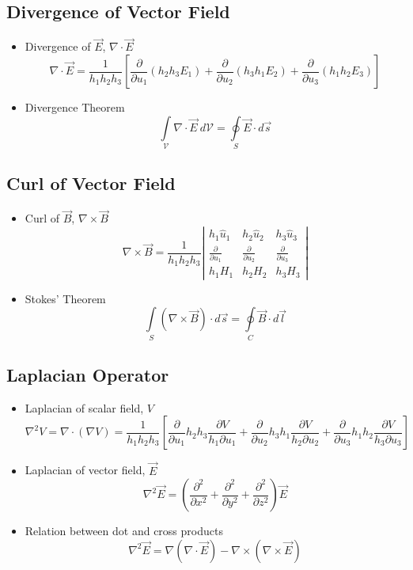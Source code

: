 \documentclass[a4paper]{article}
\begin{document}
\subsection{Divergence of Vector Field}
\begin{itemize}
    \item Divergence of $\overrightarrow{E}$, $\nabla\cdot\overrightarrow{E}$
    $$\nabla\cdot\overrightarrow{E} = \frac{1}{h_1h_2h_3}\left[\frac{\partial}{\partial u_1}(h_2h_3E_1)+\frac{\partial}{\partial u_2}(h_3h_1E_2)+\frac{\partial}{\partial u_3}(h_1h_2E_3)\right]$$
    \item Divergence Theorem
    $$\int\limits_\mathcal{V} \nabla\cdot\overrightarrow{E}\ d\mathcal{V} = \oint\limits_S \overrightarrow{E}\cdot d\vec{s}$$
\end{itemize}

\subsection{Curl of Vector Field}
\begin{itemize}
    \item Curl of $\overrightarrow{B}$, $\nabla\times\overrightarrow{B}$
    $$\nabla\times\overrightarrow{B} = \frac{1}{h_1h_2h_3}\left|
    \begin{array}{ccc}
         h_1\hat{u}_1 & h_2\hat{u}_2 & h_3\hat{u}_3\\
         \frac{\partial}{\partial u_1}& \frac{\partial}{\partial u_2} & \frac{\partial}{\partial u_3}\\
         h_1H_1 & h_2H_2 & h_3H_3
    \end{array}\right|$$
    \item Stokes' Theorem
    $$\int\limits_{S}(\nabla\times\overrightarrow{B})\cdot d\vec{s} = \oint\limits_{C} \overrightarrow{B}\cdot d\vec{l}$$
\end{itemize}

\subsection{Laplacian Operator}
\begin{itemize}
    \item Laplacian of scalar field, $V$
    $$\nabla^2 V = \nabla\cdot(\nabla V) = \frac{1}{h_1h_2h_3}\left[\frac{\partial}{\partial u_1}h_2h_3\frac{\partial V}{h_1\partial u_1}+\frac{\partial}{\partial u_2}h_3h_1\frac{\partial V}{h_2\partial u_2}+\frac{\partial}{\partial u_3}h_1h_2\frac{\partial V}{h_3\partial u_3}\right]$$
    \item Laplacian of vector field, $\overrightarrow{E}$
    $$\nabla^2 \overrightarrow{E} = \left(\frac{\partial^2}{\partial x^2}+\frac{\partial^2}{\partial y^2}+\frac{\partial^2}{\partial z^2}\right)\overrightarrow{E}$$
    \item Relation between dot and cross products
    $$\nabla^2\overrightarrow{E} = \nabla(\nabla\cdot\overrightarrow{E})-\nabla\times(\nabla\times\overrightarrow{E})$$
\end{itemize}
\end{document}
